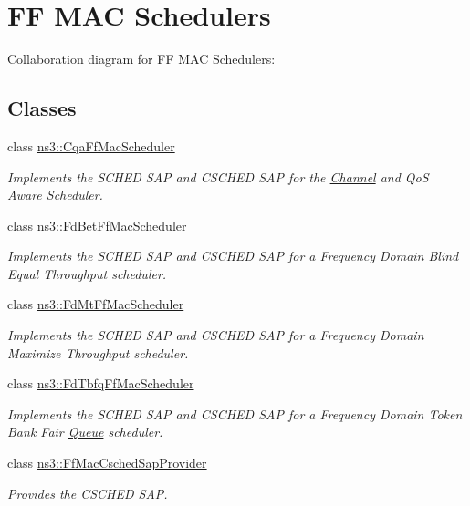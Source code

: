 \hypertarget{group__ff-api}{}\section{FF M\+AC Schedulers}
\label{group__ff-api}
Collaboration diagram for FF M\+AC Schedulers\+:
\subsection*{Classes}
\begin{DoxyCompactItemize}
\item 
class \hyperlink{classns3_1_1CqaFfMacScheduler}{ns3\+::\+Cqa\+Ff\+Mac\+Scheduler}
\begin{DoxyCompactList}\small\item\em Implements the S\+C\+H\+ED S\+AP and C\+S\+C\+H\+ED S\+AP for the \hyperlink{classns3_1_1Channel}{Channel} and QoS Aware \hyperlink{classns3_1_1Scheduler}{Scheduler}. \end{DoxyCompactList}\item 
class \hyperlink{classns3_1_1FdBetFfMacScheduler}{ns3\+::\+Fd\+Bet\+Ff\+Mac\+Scheduler}
\begin{DoxyCompactList}\small\item\em Implements the S\+C\+H\+ED S\+AP and C\+S\+C\+H\+ED S\+AP for a Frequency Domain Blind Equal Throughput scheduler. \end{DoxyCompactList}\item 
class \hyperlink{classns3_1_1FdMtFfMacScheduler}{ns3\+::\+Fd\+Mt\+Ff\+Mac\+Scheduler}
\begin{DoxyCompactList}\small\item\em Implements the S\+C\+H\+ED S\+AP and C\+S\+C\+H\+ED S\+AP for a Frequency Domain Maximize Throughput scheduler. \end{DoxyCompactList}\item 
class \hyperlink{classns3_1_1FdTbfqFfMacScheduler}{ns3\+::\+Fd\+Tbfq\+Ff\+Mac\+Scheduler}
\begin{DoxyCompactList}\small\item\em Implements the S\+C\+H\+ED S\+AP and C\+S\+C\+H\+ED S\+AP for a Frequency Domain Token Bank Fair \hyperlink{classns3_1_1Queue}{Queue} scheduler. \end{DoxyCompactList}\item 
class \hyperlink{classns3_1_1FfMacCschedSapProvider}{ns3\+::\+Ff\+Mac\+Csched\+Sap\+Provider}
\begin{DoxyCompactList}\small\item\em Provides the C\+S\+C\+H\+ED S\+AP. \end{DoxyCompactList}\item 

\end{DoxyCompactItemize}
